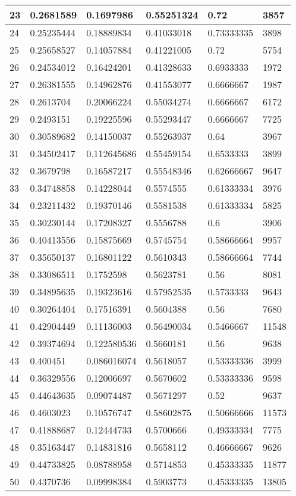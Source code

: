 \begin{longtable}{|l|l|l|l|l|l|}
23 & 0.2681589 & 0.1697986 & 0.55251324 & 0.72 & 3857 \\ \hline 
24 & 0.25235444 & 0.18889834 & 0.41033018 & 0.73333335 & 3898 \\ \hline 
25 & 0.25658527 & 0.14057884 & 0.41221005 & 0.72 & 5754 \\ \hline 
26 & 0.24534012 & 0.16424201 & 0.41328633 & 0.6933333 & 1972 \\ \hline 
27 & 0.26381555 & 0.14962876 & 0.41553077 & 0.6666667 & 1987 \\ \hline 
28 & 0.2613704 & 0.20066224 & 0.55034274 & 0.6666667 & 6172 \\ \hline 
29 & 0.2493151 & 0.19225596 & 0.55293447 & 0.6666667 & 7725 \\ \hline 
30 & 0.30589682 & 0.14150037 & 0.55263937 & 0.64 & 3967 \\ \hline 
31 & 0.34502417 & 0.112645686 & 0.55459154 & 0.6533333 & 3899 \\ \hline 
32 & 0.3679798 & 0.16587217 & 0.55548346 & 0.62666667 & 9647 \\ \hline 
33 & 0.34748858 & 0.14228044 & 0.5574555 & 0.61333334 & 3976 \\ \hline 
34 & 0.23211432 & 0.19370146 & 0.5581538 & 0.61333334 & 5825 \\ \hline 
35 & 0.30230144 & 0.17208327 & 0.5556788 & 0.6 & 3906 \\ \hline 
36 & 0.40413556 & 0.15875669 & 0.5745754 & 0.58666664 & 9957 \\ \hline 
37 & 0.35650137 & 0.16801122 & 0.5610343 & 0.58666664 & 7744 \\ \hline 
38 & 0.33086511 & 0.1752598 & 0.5623781 & 0.56 & 8081 \\ \hline 
39 & 0.34895635 & 0.19323616 & 0.57952535 & 0.5733333 & 9643 \\ \hline 
40 & 0.30264404 & 0.17516391 & 0.5604388 & 0.56 & 7680 \\ \hline 
41 & 0.42904449 & 0.11136003 & 0.56490034 & 0.5466667 & 11548 \\ \hline 
42 & 0.39374694 & 0.122580536 & 0.5660181 & 0.56 & 9638 \\ \hline 
43 & 0.400451 & 0.086016074 & 0.5618057 & 0.53333336 & 3999 \\ \hline 
44 & 0.36329556 & 0.12006697 & 0.5670602 & 0.53333336 & 9598 \\ \hline 
45 & 0.44643635 & 0.09074487 & 0.5671297 & 0.52 & 9637 \\ \hline 
46 & 0.4603023 & 0.10576747 & 0.58602875 & 0.50666666 & 11573 \\ \hline 
47 & 0.41888687 & 0.12444733 & 0.5700666 & 0.49333334 & 7775 \\ \hline 
48 & 0.35163447 & 0.14831816 & 0.5658112 & 0.46666667 & 9626 \\ \hline 
49 & 0.44733825 & 0.08788958 & 0.5714853 & 0.45333335 & 11877 \\ \hline 
50 & 0.4370736 & 0.09998384 & 0.5903773 & 0.45333335 & 13805 \\ \hline 
\end{longtable}